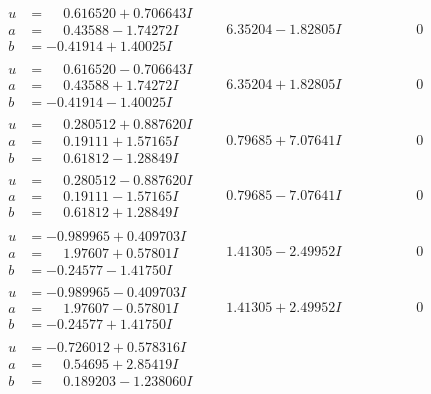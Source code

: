 \documentclass[1p]{elsarticle_modified}
\theoremstyle{definition}
\begin{document}
$$\begin{array}{c|c|c}
\begin{aligned}
u &= \phantom{-}0.616520 + 0.706643 I \\
a &= \phantom{-}0.43588 - 1.74272 I \\
b &= -0.41914 + 1.40025 I\end{aligned}
 & \phantom{-}6.35204 - 1.82805 I & \phantom{-0.000000 } 0 \\ \hline\begin{aligned}
u &= \phantom{-}0.616520 - 0.706643 I \\
a &= \phantom{-}0.43588 + 1.74272 I \\
b &= -0.41914 - 1.40025 I\end{aligned}
 & \phantom{-}6.35204 + 1.82805 I & \phantom{-0.000000 } 0 \\ \hline\begin{aligned}
u &= \phantom{-}0.280512 + 0.887620 I \\
a &= \phantom{-}0.19111 + 1.57165 I \\
b &= \phantom{-}0.61812 - 1.28849 I\end{aligned}
 & \phantom{-}0.79685 + 7.07641 I & \phantom{-0.000000 } 0 \\ \hline\begin{aligned}
u &= \phantom{-}0.280512 - 0.887620 I \\
a &= \phantom{-}0.19111 - 1.57165 I \\
b &= \phantom{-}0.61812 + 1.28849 I\end{aligned}
 & \phantom{-}0.79685 - 7.07641 I & \phantom{-0.000000 } 0 \\ \hline\begin{aligned}
u &= -0.989965 + 0.409703 I \\
a &= \phantom{-}1.97607 + 0.57801 I \\
b &= -0.24577 - 1.41750 I\end{aligned}
 & \phantom{-}1.41305 - 2.49952 I & \phantom{-0.000000 } 0 \\ \hline\begin{aligned}
u &= -0.989965 - 0.409703 I \\
a &= \phantom{-}1.97607 - 0.57801 I \\
b &= -0.24577 + 1.41750 I\end{aligned}
 & \phantom{-}1.41305 + 2.49952 I & \phantom{-0.000000 } 0 \\ \hline\begin{aligned}
u &= -0.726012 + 0.578316 I \\
a &= \phantom{-}0.54695 + 2.85419 I \\
b &= \phantom{-}0.189203 - 1.238060 I\end{aligned}

\end{array}$$
\end{document}
